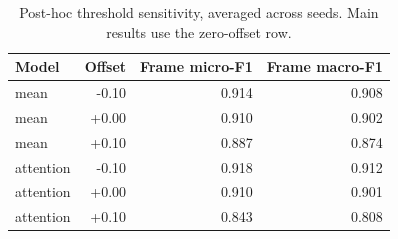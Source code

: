 \begin{table}[H]\centering\small
\caption{Post-hoc threshold sensitivity, averaged across seeds. Main results use the zero-offset row.}\label{tab:sensitivity}
\begin{tabular}{lrrr}\toprule
Model & Offset & Frame micro-F1 & Frame macro-F1 \\\midrule
mean & -0.10 & 0.914 & 0.908 \\
mean & +0.00 & 0.910 & 0.902 \\
mean & +0.10 & 0.887 & 0.874 \\
attention & -0.10 & 0.918 & 0.912 \\
attention & +0.00 & 0.910 & 0.901 \\
attention & +0.10 & 0.843 & 0.808 \\
\bottomrule\end{tabular}\end{table}
